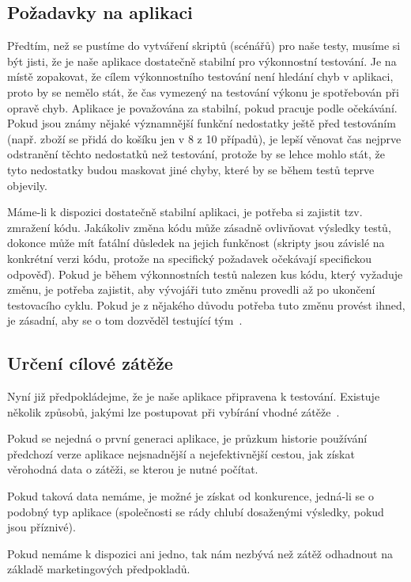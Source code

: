 \documentclass[122pt,oneside]{fithesis}
\begin{document}
\subsection{Požadavky na aplikaci}

Předtím, než se pustíme do vytváření skriptů (scénářů) pro naše testy, musíme si být jisti, že je naše aplikace dostatečně stabilní pro výkonnostní testování. Je na místě zopakovat, že cílem výkonnostního testování není hledání chyb v aplikaci, proto by se nemělo stát, že čas vymezený na testování výkonu je spotřebován při opravě chyb. Aplikace je považována za stabilní, pokud pracuje podle očekávání. Pokud jsou známy nějaké významnější funkční nedostatky ještě před testováním (např. zboží se přidá do košíku jen v 8 z 10 případů), je lepší věnovat čas nejprve odstranění těchto nedostatků než testování, protože by se lehce mohlo stát, že tyto nedostatky budou maskovat jiné chyby, které by se během testů teprve objevily.

Máme-li k dispozici dostatečně stabilní aplikaci, je potřeba si zajistit tzv. zmražení kódu. Jakákoliv změna kódu může zásadně ovlivňovat výsledky testů, dokonce může mít fatální důsledek na jejich funkčnost (skripty jsou závislé na konkrétní verzi kódu, protože na specifický požadavek očekávají specifickou odpověď). Pokud je během výkonnostních testů nalezen kus kódu, který vyžaduje změnu, je potřeba zajistit, aby vývojáři tuto změnu provedli až po ukončení testovacího cyklu. Pokud je z nějakého důvodu potřeba tuto změnu provést ihned, je zásadní, aby se o tom dozvěděl testující tým~\cite{molyneaux09}.

\subsection{Určení cílové zátěže}

Nyní již předpokládejme, že je naše aplikace připravena k testování. Existuje několik způsobů, jakými lze postupovat při vybírání vhodné zátěže~\cite{barber11}.

Pokud se nejedná o první generaci aplikace, je průzkum historie používání předchozí verze aplikace nejsnadnější a nejefektivnější cestou, jak získat věrohodná data o zátěži, se kterou je nutné počítat.

Pokud taková data nemáme, je možné je získat od konkurence, jedná-li se o podobný typ aplikace (společnosti se rády chlubí dosaženými výsledky, pokud jsou příznivé).

Pokud nemáme k dispozici ani jedno, tak nám nezbývá než zátěž odhadnout na základě marketingových předpokladů.
\end{document}
